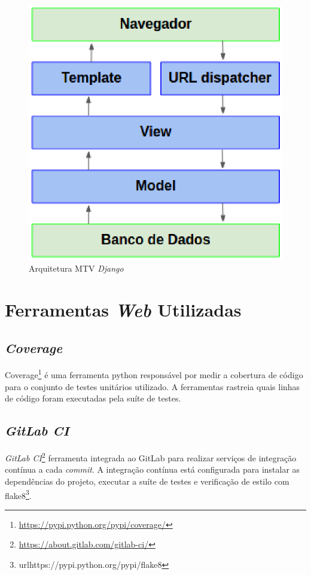 \begin{figure}[h]
    \centering
    \includegraphics[keepaspectratio=true,scale=0.5]{figuras/django-arquitetura.eps}
    \caption{Arquitetura MTV \textit{Django}}
    \label{django-arq}
\end{figure}

\section{Ferramentas \textit{Web} Utilizadas}
    \subsection{\textit{Coverage}}
    Coverage\footnote{\url{https://pypi.python.org/pypi/coverage/}} é uma ferramenta python responsável por medir a cobertura de código para o conjunto de testes unitários utilizado. A ferramentas rastreia quais linhas de código foram executadas pela suíte de testes.

    \subsection{\textit{GitLab CI}}
    \textit{GitLab CI}\footnote{\url{https://about.gitlab.com/gitlab-ci/}} ferramenta integrada ao {GitLab} para realizar serviços de integração contínua a cada \textit{commit}. A integração contínua está configurada para instalar as dependências do projeto, executar a suíte de testes e verificação de estilo com flake8\footnote{url{https://pypi.python.org/pypi/flake8}}.

